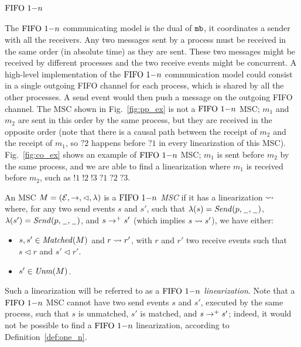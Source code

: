\paragraph{\bf $\text{FIFO } 1\mathsf{-}n$}
The $\text{FIFO } 1\mathsf{-}n$ communicating model is the dual of $\mathtt{mb}$, it coordinates a sender with all the receivers. Any two messages sent by a process  must be received in the same order (in absolute time) as they are sent. These two messages might be received by different processes and the two receive events might be concurrent.
A high-level implementation of the $\text{FIFO } 1\mathsf{-}n$ communication model could consist in a single outgoing FIFO channel for each process, which is shared by all the other processes. A send event would then push a message on the outgoing FIFO channel.
The MSC shown in Fig.~\ref{fig:pp_ex} is not a $\text{FIFO } 1\mathsf{-}n$ MSC; $m_1$ and $m_2$ are sent in this order by the same process, but they are received in the opposite order (note that there is a causal path between the receipt of $m_2$ and the receipt of $m_1$, so $?2$ happens before $?1$ in every linearization of this MSC). Fig.~\ref{fig:co_ex} shows an example of $\text{FIFO } 1\mathsf{-}n$ MSC; $m_1$ is sent before $m_2$ by the same process, and we are able to find a linearization where $m_1$ is received before $m_2$, such as $!1\;!2\;!3\;?1\;?2\;?3$. 

\begin{definition}\label{def:one_n}
An MSC $M = (\mathcal{E},\to,\lhd,\lambda)$ is a \emph{$\text{FIFO } 1\mathsf{-}n$ MSC} if it has a linearization $\rightsquigarrow$ where, for any two send events $s$ and $s'$, such that $\lambda(s)={\mathit{Send}(p,\hspace{0.1em}\underline{\hspace{0.5em}}\hspace{0.1em},\hspace{0.1em}\underline{\hspace{0.5em}}\hspace{0.1em})}$, $\lambda(s')={\mathit{Send}(p,\hspace{0.1em}\underline{\hspace{0.5em}}\hspace{0.1em},\hspace{0.1em}\underline{\hspace{0.5em}}\hspace{0.1em})}$, and $s \to^+ s'$ (which implies $s \rightsquigarrow s'$), we have either:
\begin{itemize}%
	\item $s,s' \in \mathit{Matched}(M)$ and $r \rightsquigarrow r'$, with  $r$ and $r'$  two receive events such that $s \lhd r$ and $s' \lhd r'$.
	\item $s' \in \mathit{Unm}(M)$.
\end{itemize}
\end{definition}

Such a linearization will be referred to as a \emph{$\text{FIFO } 1\mathsf{-}n$ linearization}. Note that a $\text{FIFO } 1\mathsf{-}n$ MSC cannot have two send events $s$ and $s'$, executed by the same process, such that $s$ is unmatched, $s'$ is matched, and $s \to^+ s'$; indeed, it would not be possible to find a $\text{FIFO } 1\mathsf{-}n$ linearization, according to Definition~\ref{def:one_n}.


